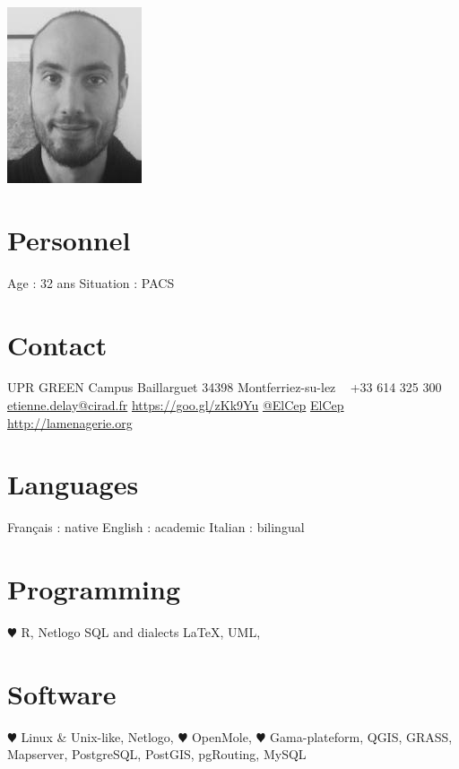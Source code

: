 \documentclass[]{cv-etienne}
\begin{document}

\begin{aside} %
\includegraphics{img/delay_s}
\section{Personnel}
Age :  32 ans
Situation : PACS
\section{Contact}
UPR GREEN
Campus Baillarguet
34398 Montferriez-su-lez
~
+33 614 325 300
~
{\color{lightgray}{\FA \faEnvelope}} \href{mailto:etienne.delay@cirad.fr}{\footnotesize etienne.delay@cirad.fr}
{\color{linkedin}{\FA \faLinkedin}} \href{https://www.linkedin.com/in/etienne-delay-8871a45b/}{\footnotesize https://goo.gl/zKk9Yu}
{\color{twitter}{\FA \faTwitter}} {\footnotesize \href{https://twitter.com/ElCep}{@ElCep}}
{\color{github}{\FA \faGithub}} {\footnotesize \href{https://github.com/ElCep}{ElCep}}
{\color{lightgray}{\FA \faHome}} {\footnotesize \href{http://elcep.legtux.org}{http://lamenagerie.org}}
\section{Languages}
Français : native
English : academic
Italian : bilingual
\section{Programming}
{\color{red} $\varheartsuit$} R, Netlogo
SQL and dialects
\LaTeX, UML,
\section{Software}
{\color{red} $\varheartsuit$} Linux \& Unix-like,
Netlogo, {\color{red} $\varheartsuit$} OpenMole,
{\color{red} $\varheartsuit$} Gama-plateform,
QGIS, GRASS, Mapserver,
PostgreSQL, PostGIS,
pgRouting, MySQL
\end{aside}
\end{document}
